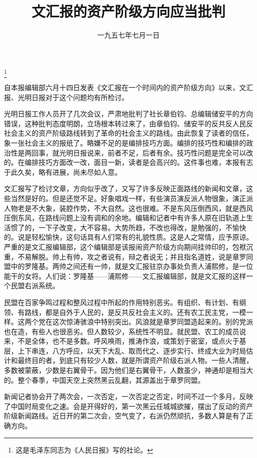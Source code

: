 
\title{文汇报的资产阶级方向应当批判}
\date{一九五七年七月一日}
\thanks{这是毛泽东同志为《人民日报》写的社论。}
\maketitle


自本报编辑部六月十四日发表《文汇报在一个时间内的资产阶级方向》以来，文汇报、光明日报对于这个问题均有所检讨。

光明日报工作人员开了几次会议，严肃地批判了社长章伯钧、总编辑储安平的方向错误，这种批判态度明朗，立场根本转过来了，由章伯钧、储安平的反共反人民反社会主义的资产阶级路线转到了革命的社会主义的路线。由此恢复了读者的信任，象一张社会主义的报纸了。略嫌不足的是编排技巧方面。编排的技巧性和编排的政治性是两回事，就光明日报说来，前者不足，后者有余。技巧性问题是完全可以改的。在编排技巧方面改一改，面目一新，读者是会高兴的。这件事也难，本报有志于此久矣，略有进展，尚未尽如人意。

文汇报写了检讨文章，方向似乎改了，又写了许多反映正面路线的新闻和文章，这些当然是好的。但是还觉不足。好象唱戏一样，有些演员演反派人物很象，演正派人物老是不大象，装腔作势，不大自然。这也很难。不是东风压倒西风，就是西风压倒东风，在路线问题上没有调和的余地。编辑和记者中有许多人原在旧轨道上生活惯了的，一下子改变，大不容易。大势所趋，不改也得改，是勉强的，不愉快的。说是轻松愉快，这句话具有人们常有的礼貌性质。这是人之常情，应予原谅。严重的是文汇报编辑部，这个编辑部是该报闹资产阶级方向期间挂帅印的，包袱沉重，不易解脱。帅上有帅，攻之者说有，辩之者说无；并且指名道姓，说是章罗同盟中的罗隆基。两帅之间还有一帅，就是文汇报驻京办事处负责人浦熙修，是一位能干的女将。人们说：罗隆基——浦熙修——文汇报编辑部，就是文汇报的这样一个民盟右派系统。

民盟在百家争鸣过程和整风过程中所起的作用特别恶劣。有组织、有计划、有纲领、有路线，都是自外于人民的，是反共反社会主义的。还有农工民主党，一模一样。这两个党在这次惊涛骇浪中特别突出。风浪就是章罗同盟造起来的。别的党派也在造，有些人也很恶劣。但人数较少，系统性不明显。就民盟、农工的成员说来，不是全体，也不是多数。呼风唤雨，推涛作浪，或策划于密室，或点火于基层，上下串连，八方呼应，以天下大乱、取而代之、逐步实行、终成大业为时局估计和最终目的者，到底只有较少人数，就是所谓资产阶级右派人物。一些人清醒，多数被蒙蔽，少数是右翼骨干。因为他们是右翼骨干，人数虽少，神通却是相当大的。整个春季，中国天空上突然黑云乱翻，其源盖出于章罗同盟。

新闻记者协会开了两次会，一次否定，一次否定之否定，时间不过一个多月，反映了中国时局变化之速。会是开得好的，第一次黑云任城城欲摧，摆出了反动的资产阶级新闻路线。近日开的第二次会，空气变了，右派仍然顽抗，多数人算是有了正确方向。

